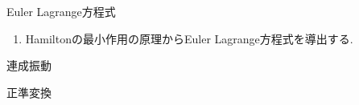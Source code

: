 \documentclass[11pt,a4paper]{jarticle}
\title{}
\author{解析力学基本事項}
\date{}
\begin{document}
\maketitle
\item Euler Lagrange方程式
\begin{enumerate}
    \item Hamiltonの最小作用の原理からEuler Lagrange方程式を導出する.
\end{enumerate}
\item 連成振動
\item 正準変換
\end{document}
